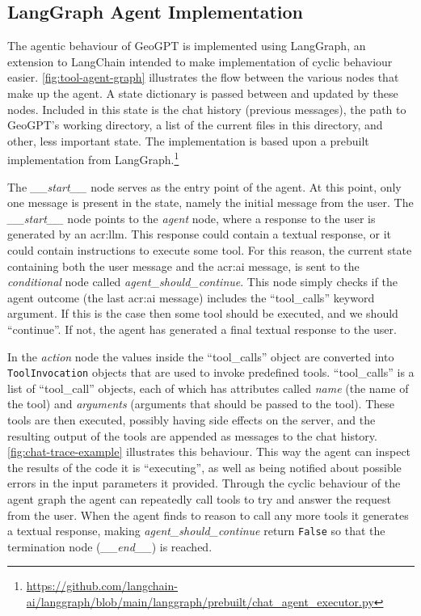 \subsection{LangGraph Agent Implementation}
\label{subsec:lg-agent-implementation}

The agentic behaviour of GeoGPT is implemented using LangGraph, an extension to LangChain intended to make implementation of cyclic behaviour easier. \autoref{fig:tool-agent-graph} illustrates the flow between the various nodes that make up the agent. A state dictionary is passed between and updated by these nodes. Included in this state is the chat history (previous messages), the path to GeoGPT's working directory, a list of the current files in this directory, and other, less important state. The implementation is based upon a prebuilt implementation from LangGraph.\footnote{\url{https://github.com/langchain-ai/langgraph/blob/main/langgraph/prebuilt/chat_agent_executor.py}}

The \textit{\_\_start\_\_} node serves as the entry point of the agent. At this point, only one message is present in the state, namely the initial message from the user. The \textit{\_\_start\_\_} node points to the \textit{agent} node, where a response to the user is generated by an \acrshort{acr:llm}. This response could contain a textual response, or it could contain instructions to execute some tool. For this reason, the current state containing both the user message and the \acrshort{acr:ai} message, is sent to the \textit{conditional} node called \textit{agent\_should\_continue}. This node simply checks if the agent outcome (the last \acrshort{acr:ai} message) includes the \enquote{tool\_calls} keyword argument. If this is the case then some tool should be executed, and we should \enquote{continue}. If not, the agent has generated a final textual response to the user.

In the \textit{action} node the values inside the \enquote{tool\_calls} object are converted into \texttt{ToolInvocation} objects that are used to invoke predefined tools. \enquote{tool\_calls} is a list of \enquote{tool\_call} objects, each of which has attributes called \textit{name} (the name of the tool) and \textit{arguments} (arguments that should be passed to the tool). These tools are then executed, possibly having side effects on the server, and the resulting output of the tools are appended as messages to the chat history. \autoref{fig:chat-trace-example} illustrates this behaviour. This way the agent can inspect the results of the code it is \enquote{executing}, as well as being notified about possible errors in the input parameters it provided. Through the cyclic behaviour of the agent graph the agent can repeatedly call tools to try and answer the request from the user. When the agent finds to reason to call any more tools it generates a textual response, making \textit{agent\_should\_continue} return \texttt{False} so that the termination node (\textit{\_\_end\_\_}) is reached.


